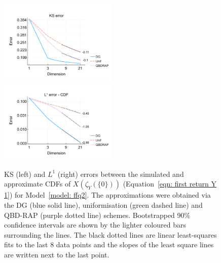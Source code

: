 \begin{figure}[h]
	\centering
	\includegraphics[width=0.5\textwidth,trim={0.75cm 0.8cm 0.25cm 1.25cm},clip]{chapter6/figs/ffq/discts/ks_error_formatted.pdf}%
	\includegraphics[width=0.5\textwidth,trim={0.75cm 0.8cm 0.25cm 1.25cm},clip]{chapter6/figs/ffq/discts/l1_cdf_error_formatted.pdf}
	\caption{KS (left) and \(L^1\) (right) errors between the simulated and approximate CDFs of \(X(\zeta_{Y}(\{0\}))\) (Equation~\ref{eqn: first return Y 1}) for Model~\ref{model: ffq2}. The approximations were obtained via the DG (blue solid line), uniformisation (green dashed line) and QBD-RAP (purple dotted line) schemes. Bootstrapped 90\% confidence intervals are shown by the lighter coloured bars surrounding the lines. The black dotted lines are linear least-squares fits to the last 8 data points and the slopes of the least square lines are written next to the last point.} 
	\label{fig: ffq return discts} 
\end{figure} 
